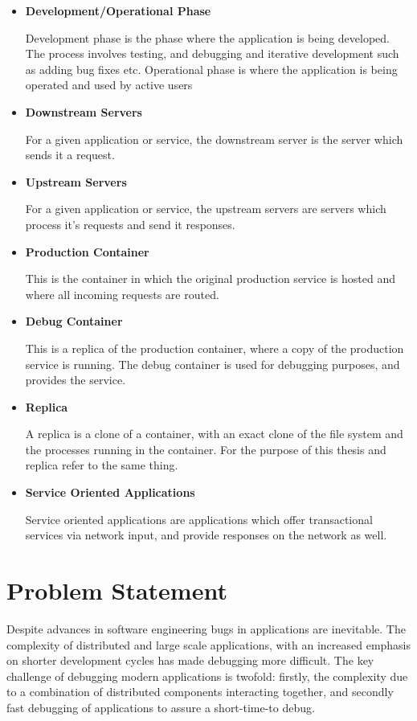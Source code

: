 \begin{itemize}
	
	\item \hypertarget{defn:development-phase}{\textbf{Development/Operational Phase}} Development phase is the phase where the application is being developed.
	The process involves testing, and debugging and iterative development such as adding bug fixes etc. Operational phase is where the application is being operated and used by active users
	
	\item \hypertarget{defn:downstream-servers}{\textbf{Downstream Servers}} 
	For a given application or service, the downstream server is the server which sends it a request.
	
	\item \hypertarget{defn:upstream-servers}{\textbf{Upstream Servers}}
	For a given application or service, the upstream servers are servers which process it's requests and send it responses.
	
	
	\item \hypertarget{defn:production container}{\textbf{Production Container}}
	This is the container in which the original production service is hosted and where all incoming requests are routed.
	
	\item \hypertarget{defn:debug container}{\textbf{Debug Container}}
	This is a replica of the production container, where a copy of the production service is running. The debug container is used for debugging purposes, and provides the \livedebugging service.
	
	\item \hypertarget{defn:replica}{\textbf{Replica}}
	A replica is a clone of a container, with an exact clone of the file system and the processes running in the container. For the purpose of this thesis \debugcontainer and replica refer to the same thing.
	
	\item \hypertarget{defn:SOA}{\textbf{Service Oriented Applications}}
	Service oriented applications are applications which offer transactional services via network input, and provide responses on the network as well.
	
\end{itemize}

\section{Problem Statement}
\label{sec:introProblemStatement}

Despite advances in software engineering bugs in applications are inevitable.
The complexity of distributed and large scale applications, with an increased emphasis on shorter development cycles has made debugging more difficult.
The key challenge of debugging modern applications is twofold: firstly, the complexity due to a combination of distributed components interacting together, and secondly fast debugging of applications to assure a short-time-to debug.

